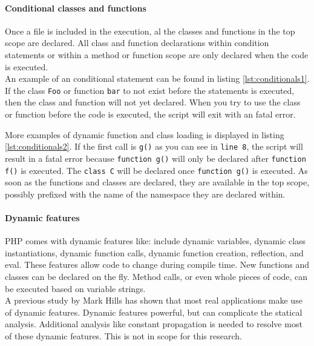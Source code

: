 \documentclass[../main.tex]{subfiles}
\begin{document}
    \paragraph{Conditional classes and functions}
    Once a file is included in the execution, al the classes and functions in the top scope are declared.
    All class and function declarations within condition statements or within a method or function scope are only declared when the code is executed.
    \\
    An example of an conditional statement can be found in listing \ref{lst:conditionals1}.
    If the class \texttt{Foo} or function \texttt{bar} to not exist before the statements is executed, then the class and function will not yet declared. 
    When you try to use the class or function before the code is executed, the script will exit with an fatal error.

    

    More examples of dynamic function and class loading is displayed in listing \ref{lst:conditionals2}.
    If the first call is \texttt{g()} as you can see in \texttt{line 8}, the script will result in a fatal error because \texttt{function g()} will only be declared after \texttt{function f()} is executed.
    The \texttt{class C} will be declared once \texttt{function g()} is executed.
    As soon as the functions and classes are declared, they are available in the top scope, possibly prefixed with the name of the namespace they are declared within.
    

    
    \paragraph{Dynamic features}
    PHP comes with dynamic features like: include dynamic variables, dynamic class instantiations, dynamic function calls, dynamic function creation, reflection, and eval.
    These features allow code to change during compile time. 
    New functions and classes can be declared on the fly.
    Method calls, or even whole pieces of code, can be executed based on variable strings.
    \\
    A previous study by Mark Hills\cite{Hil:13} has shown that most real applications make use of dynamic features.
    Dynamic features powerful, but can complicate the statical analysis.
    Additional analysis like constant propagation is needed to resolve most of these dynamic features.
    This is not in scope for this research.
    
\end{document}
